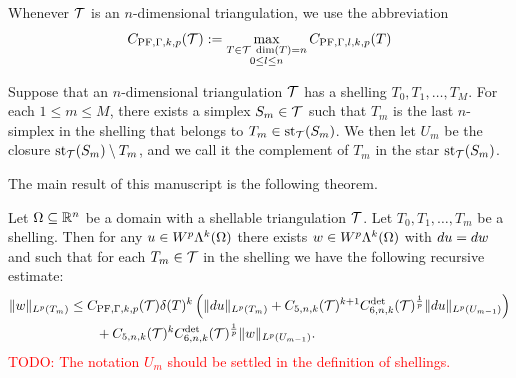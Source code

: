 \documentclass[10pt,letterpaper]{article}
\newcommand{\todo}[1]{\textcolor{red}{TODO: #1}}
\begin{document}
Whenever ${\mathcal T}$ is an $n$-dimensional triangulation, we use the abbreviation
\begin{align*}
    C_{{\rm PF},\Gamma,k,p}({\mathcal T}) 
    :=
    \max\limits_{ \substack{ T \in {\mathcal T} \; \dim(T)=n \\ 0 \leq l \leq n } }
    C_{{\rm PF},\Gamma,l,k,p}(T)   
\end{align*}




Suppose that an $n$-dimensional triangulation ${\mathcal T}$ has a shelling $T_{0}, T_{1}, \dots, T_{M}$. 
For each $1 \leq m \leq M$, there exists a simplex $S_{m} \in {\mathcal T}$ 
such that $T_{m}$ is the last $n$-simplex in the shelling that belongs to $T_{m} \in \operatorname{st}_{{\mathcal T}}(S_{m})$.
We then let $U_{m}$ be the closure $\operatorname{st}_{{\mathcal T}}(S_{m}) \setminus T_{m}$,
and we call it the complement of $T_{m}$ in the star $\operatorname{st}_{{\mathcal T}}(S_{m})$. 



The main result of this manuscript is the following theorem. 

\begin{theorem}\label{theorem:poincarefriedrichsestimate:exterior}
    Let $\Omega \subseteq {\mathbb R}^{n}$ be a domain with a shellable triangulation ${\mathcal T}$.
    Let $T_0, T_1, \dots, T_m$ be a shelling.
    Then for any $u \in W^{p}\Lambda^{k}(\Omega)$ 
    there exists $w \in W^{p}\Lambda^{k}(\Omega)$ with $d u = d w$ 
    and such that for each $T_{m} \in {\mathcal T}$ in the shelling
    we have the following recursive estimate: 
    \begin{align*}
        \| w \|_{L^{p}(T_{m})}
        &
        \leq  
        C_{{\rm PF},\Gamma,k,p}({\mathcal T}) 
        {\delta}(T)^{k} 
        \left( 
            \| d u      \|_{L^{p}(T_{m})} 
            +
            C_{5,n,k}({\mathcal T})^{k+1} 
            C^{\det}_{6,n,k}({\mathcal T})^{\frac 1 p} 
            \| d u \|_{L^{p}(U_{m-1})}
        \right)
        \\&\qquad
        + 
        C_{5,n,k}({\mathcal T})^{k} 
        C^{\det}_{6,n,k}({\mathcal T})^{\frac 1 p} 
        \| w \|_{L^{p}(U_{m-1})}
        .
    \end{align*}
    \todo{The notation $U_m$ should be settled in the definition of shellings.}
\end{theorem}
\end{document}
